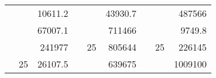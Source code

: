 \begin{table}[H]
\begin{tabular}{|ccrccrccc}
\rowcolor[HTML]{DAE8FC} 
\multicolumn{1}{|c|}{\cellcolor[HTML]{FFFFC7}}                                & \multicolumn{1}{c|}{\cellcolor[HTML]{DAE8FC}}                      & \multicolumn{1}{r|}{\cellcolor[HTML]{DAE8FC}10611.2}   & \multicolumn{1}{c|}{\cellcolor[HTML]{FFFFC7}}                                & \multicolumn{1}{c|}{\cellcolor[HTML]{DAE8FC}}                       & \multicolumn{1}{r|}{\cellcolor[HTML]{DAE8FC}43930.7}   & \multicolumn{1}{c|}{\cellcolor[HTML]{FFFFC7}}                                & \multicolumn{1}{c|}{\cellcolor[HTML]{DAE8FC}}                      & \multicolumn{1}{r|}{\cellcolor[HTML]{DAE8FC}487566}    \\ \cline{3-3} \cline{6-6} \cline{9-9} 
\multicolumn{1}{|c|}{\cellcolor[HTML]{FFFFC7}}                                & \multicolumn{1}{c|}{\cellcolor[HTML]{DAE8FC}}                      & \multicolumn{1}{r|}{\cellcolor[HTML]{DDFDFF}67007.1}   & \multicolumn{1}{c|}{\cellcolor[HTML]{FFFFC7}}                                & \multicolumn{1}{c|}{\cellcolor[HTML]{DAE8FC}}                       & \multicolumn{1}{r|}{\cellcolor[HTML]{DDFDFF}711466}    & \multicolumn{1}{c|}{\cellcolor[HTML]{FFFFC7}}                                & \multicolumn{1}{c|}{\cellcolor[HTML]{DAE8FC}}                      & \multicolumn{1}{r|}{\cellcolor[HTML]{DDFDFF}9749.8}    \\ \cline{3-3} \cline{6-6} \cline{9-9} 
\rowcolor[HTML]{DAE8FC} 
\multicolumn{1}{|c|}{\cellcolor[HTML]{FFFFC7}}                                & \multicolumn{1}{c|}{\cellcolor[HTML]{DAE8FC}}                      & \multicolumn{1}{r|}{\cellcolor[HTML]{DAE8FC}241977}    & \multicolumn{1}{c|}{\cellcolor[HTML]{FFFFC7}}                                & \multicolumn{1}{c|}{\multirow{-9}{*}{\cellcolor[HTML]{DAE8FC}25}}   & \multicolumn{1}{r|}{\cellcolor[HTML]{DAE8FC}805644}    & \multicolumn{1}{c|}{\cellcolor[HTML]{FFFFC7}}                                & \multicolumn{1}{c|}{\multirow{-9}{*}{\cellcolor[HTML]{DAE8FC}25}}  & \multicolumn{1}{r|}{\cellcolor[HTML]{DAE8FC}226145}    \\ \cline{3-3} \cline{5-6} \cline{8-9} 
\multicolumn{1}{|c|}{\cellcolor[HTML]{FFFFC7}}                                & \multicolumn{1}{c|}{\multirow{-10}{*}{\cellcolor[HTML]{DAE8FC}25}} & \multicolumn{1}{r|}{\cellcolor[HTML]{DDFDFF}26107.5}   & \multicolumn{1}{c|}{\cellcolor[HTML]{FFFFC7}}                                & \multicolumn{1}{c|}{\cellcolor[HTML]{DDFDFF}}                       & \multicolumn{1}{r|}{\cellcolor[HTML]{DAE8FC}639675}    & \multicolumn{1}{c|}{\cellcolor[HTML]{FFFFC7}}                                & \multicolumn{1}{c|}{\cellcolor[HTML]{DDFDFF}}                      & \multicolumn{1}{r|}{\cellcolor[HTML]{DAE8FC}1009100}   \\ \cline{2-3} \cline{6-6} \cline{9-9} 

\end{tabular}
\end{table}
